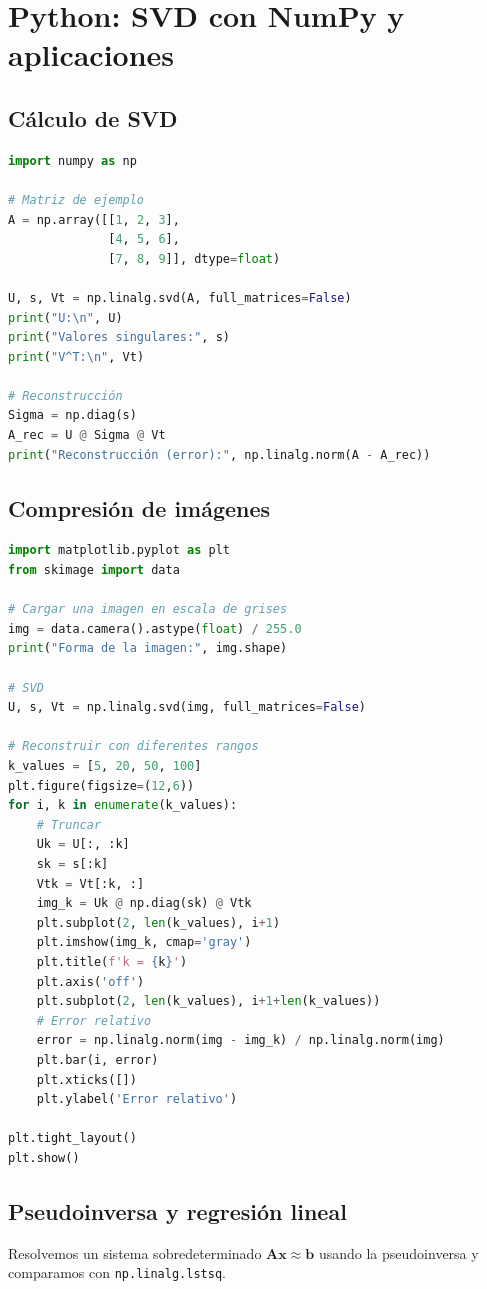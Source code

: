 \documentclass[12pt,a4paper,openany,oneside]{book}
\begin{document}
\section{Python: SVD con NumPy y aplicaciones}

\subsection{Cálculo de SVD}
\begin{lstlisting}[language=Python]
import numpy as np

# Matriz de ejemplo
A = np.array([[1, 2, 3],
              [4, 5, 6],
              [7, 8, 9]], dtype=float)

U, s, Vt = np.linalg.svd(A, full_matrices=False)
print("U:\n", U)
print("Valores singulares:", s)
print("V^T:\n", Vt)

# Reconstrucción
Sigma = np.diag(s)
A_rec = U @ Sigma @ Vt
print("Reconstrucción (error):", np.linalg.norm(A - A_rec))
\end{lstlisting}

\subsection{Compresión de imágenes}
\begin{lstlisting}[language=Python]
import matplotlib.pyplot as plt
from skimage import data

# Cargar una imagen en escala de grises
img = data.camera().astype(float) / 255.0
print("Forma de la imagen:", img.shape)

# SVD
U, s, Vt = np.linalg.svd(img, full_matrices=False)

# Reconstruir con diferentes rangos
k_values = [5, 20, 50, 100]
plt.figure(figsize=(12,6))
for i, k in enumerate(k_values):
    # Truncar
    Uk = U[:, :k]
    sk = s[:k]
    Vtk = Vt[:k, :]
    img_k = Uk @ np.diag(sk) @ Vtk
    plt.subplot(2, len(k_values), i+1)
    plt.imshow(img_k, cmap='gray')
    plt.title(f'k = {k}')
    plt.axis('off')
    plt.subplot(2, len(k_values), i+1+len(k_values))
    # Error relativo
    error = np.linalg.norm(img - img_k) / np.linalg.norm(img)
    plt.bar(i, error)
    plt.xticks([])
    plt.ylabel('Error relativo')

plt.tight_layout()
plt.show()
\end{lstlisting}

\subsection{Pseudoinversa y regresión lineal}
Resolvemos un sistema sobredeterminado $\mathbf{A}\mathbf{x} \approx \mathbf{b}$ usando la pseudoinversa y comparamos con \texttt{np.linalg.lstsq}.
\end{document}
